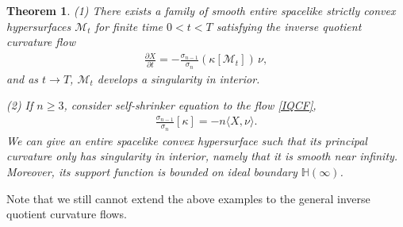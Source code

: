 \documentclass[reqno]{amsart}
\newtheorem{theorem}{Theorem}[section]
\theoremstyle{remark}
\theoremstyle{definition}
\numberwithin{equation}{section}
\begin{document}
\begin{theorem}\label{Counterexample}
(1) There exists a family of smooth entire spacelike strictly convex hypersurfaces $\mathcal{M}_t$ for finite time $0<t<T$ satisfying 
the inverse quotient curvature flow
\begin{align}\label{IQCF}
    \frac{\partial X}{\partial t}
    =
    -\frac{\sigma_{n-1}}{\sigma_n}(\kappa[\mathcal{M}_t])\,\nu,
\end{align}
and as $t\rightarrow T$, $\mathcal{M}_t$ develops a singularity in interior.


(2) If $n \geqslant 3$, consider self-shrinker equation to the flow \eqref{IQCF}, 
\begin{align}\label{QS}
    \frac{\sigma_{n-1}}{\sigma_n}\left[ \kappa \right] = - n \langle X, \nu \rangle.
\end{align}
We can give an entire spacelike convex hypersurface such that its principal curvature only has singularity in interior, namely that it is smooth near infinity. Moreover, its support function is bounded on ideal boundary $\mathbb{H}(\infty)$.      
\end{theorem}

Note that we still cannot extend the above examples to the general inverse quotient curvature flows.
\end{document}
